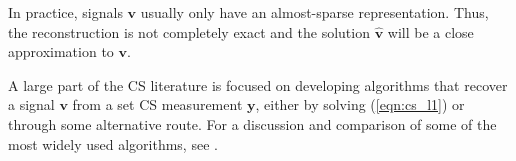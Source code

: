 In practice, signals $\bm v$ usually only have an almost-sparse representation.
Thus, the reconstruction is not completely exact and the solution $\bm{\hat v}$ will be a close approximation to $\bm v$.

A large part of the CS literature is focused on developing algorithms that recover a signal $\bm v$ from a set CS measurement $\bm y$, either by solving (\ref{eqn:cs_l1}) or through some alternative route.
For a discussion and comparison of some of the most widely used algorithms, see \cite{pilikos2014}.



